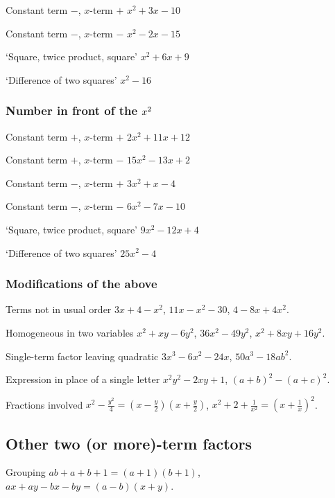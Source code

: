 \documentclass{article}
\begin{document}
Constant term \(-\), \(x\)-term \(+\) \hfill \(x^2 + 3x - 10\)

Constant term \(-\), \(x\)-term \(-\) \hfill \(x^2 - 2x - 15\)

\lq Square, twice product, square' \hfill \(x^2 + 6x + 9\)

\lq Difference of two squares' \hfill \(x^2 - 16\)

\subsubsection{Number in front of the \protect\(x^2\protect\)}

Constant term \(+\), \(x\)-term \(+\) \hfill \(2x^2 + 11x +12\)

Constant term \(+\), \(x\)-term \(-\) \hfill \(15x^2 - 13x + 2\)

Constant term \(-\), \(x\)-term \(+\) \hfill \(3x^2 + x - 4\)

Constant term \(-\), \(x\)-term \(-\) \hfill \(6x^2 - 7x - 10\)

\lq Square, twice product, square' \hfill \(9x^2 - 12x + 4\)

\lq Difference of two squares' \hfill \(25x^2 - 4\)

\subsubsection{Modifications of the above}

Terms not in usual order \hfill \(3x+4-x^2\), \(11x - x^2 - 30\), \(4 - 8x + 4x^2\).

Homogeneous in two variables \hfill \(x^2 + xy - 6y^2\), \(36x^2 - 49y^2\), \(x^2 + 8xy + 16y^2\).

Single-term factor leaving quadratic \hfill \(3x^3 - 6x^2 - 24x\), \(50a^3 - 18ab^2\).

Expression in place of a single letter \hfill \(x^2y^2 - 2xy + 1\), \((a+b)^2 - (a+c)^2\).

Fractions involved \hfill \(x^2 - \frac{y^2}{4} = \left(  x - \frac{y}{2} \right)  \left(  x + \frac{y}{2} \right) \), \(x^2 + 2 + \frac{1}{x^2} = \left(  x + \frac{1}{x} \right)  ^2\).

\subsection{Other two (or more)-term factors}

Grouping \hfill \(ab + a + b + 1 = (a+1)(b+1)\), \(ax + ay - bx - by = (a-b)(x+y)\).
\end{document}
